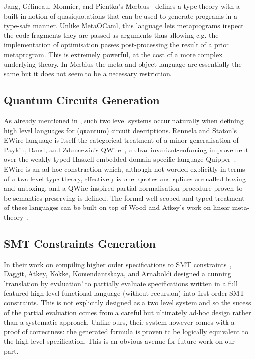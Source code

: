 Jang, Gélineau, Monnier, and Pientka's
Mœbius~\cite{DBLP:journals/pacmpl/JangGMP22} defines
a type theory with a built in notion of quasiquotations
that can be used to generate programs in a type-safe
manner.
%
Unlike MetaOCaml, this language lets metaprograms
inspect the code fragments
they are passed as arguments thus allowing e.g. the
implementation of optimisation passes post-processing the
result of a prior metaprogram.
%
This is extremely powerful, at the cost of a more complex
underlying theory.
%
In Mœbius the meta and object language are essentially the
same but it does not seem to be a necessary restriction.

\subsection{Quantum Circuits Generation}
As already mentioned in , such two level
systems occur naturally when defining high level languages
for (quantum) circuit descriptions.
%
Rennela and Staton's EWire language is itself the categorical
treatment of a minor generalisation of Paykin, Rand,
and Zdancewic's QWire~\cite{DBLP:conf/popl/Paykin0Z17},
a clear invariant-enforcing improvement over the weakly
typed Haskell embedded domain specific language Quipper~\cite{DBLP:conf/rc/GreenLRSV13}.
%
EWire is an ad-hoc construction which, although not worded
explicitly in terms of a two level type theory, effectively
is one: quotes and splices are called boxing and unboxing,
and a QWire-inspired partial normalisation procedure
proven to be semantics-preserving is defined.
%
The formal well scoped-and-typed treatment of these languages
can be built on top of Wood and Atkey's work on linear
meta-theory~\cite{DBLP:conf/esop/WoodA22}.

\subsection{SMT Constraints Generation}
In their work on compiling higher order specifications to SMT
constraints~\cite{DBLP:conf/cpp/DaggittAKKA23},
Daggit, Atkey, Kokke, Komendantskaya, and Arnaboldi
designed a cunning 'translation by evaluation' to
partially evaluate specifications written in a full featured
high level functional language (without recursion)
into first order SMT constraints.
%
This is not explicitly designed as a two level system and
so the sucess of the partial evaluation comes from a careful
but ultimately ad-hoc design rather than a systematic approach.
%
Unlike ours, their system however comes with a proof of
correctness: the generated formula is proven to be logically
equivalent to the high level specification.
%
This is an obvious avenue for future work on our part.

